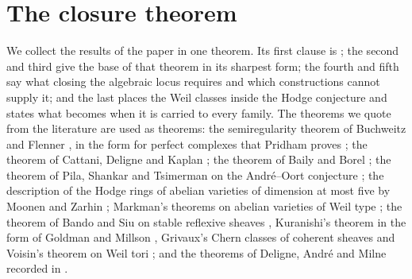 \section{The closure theorem}\label{sec:final}

We collect the results of the paper in one theorem. Its first clause is
\cite[Theorem~1.1]{paperI}; the second and third give the base of that theorem in its
sharpest form; the fourth and fifth say what closing the algebraic locus
requires and which constructions cannot supply it; and the last places the
Weil classes inside the Hodge conjecture and states what \cite[Theorem~1.1]{paperI}
becomes when it is carried to every family. The theorems we quote from the
literature are used as theorems: the semiregularity theorem of Buchweitz and
Flenner \cite{BF03}, in the form for perfect complexes that Pridham proves
\cite{Pri24}; the theorem of Cattani, Deligne and Kaplan \cite{CDK95}; the
theorem of Baily and Borel \cite{BB66}; the theorem of Pila, Shankar and
Tsimerman on the Andr\'e--Oort conjecture \cite{PST}; the description of the
Hodge rings of abelian varieties of dimension at most five by Moonen and Zarhin
\cite{MZ99}; Markman's theorems on abelian varieties of Weil type
\cite{Mar25a,Mar25b}; the theorem of Bando and Siu on stable reflexive
sheaves \cite{BS94}, Kuranishi's theorem in the form of Goldman and Millson
\cite{Kur65,GM88}, Grivaux's Chern classes of coherent sheaves \cite{Gri10}
and Voisin's theorem on Weil tori \cite{Voi02b}; and the theorems of Deligne,
Andr\'e and Milne recorded in 
\cite{Del71,And96b,Mil20}.

